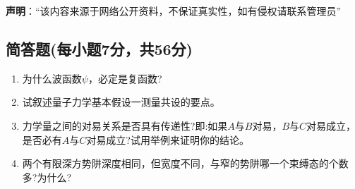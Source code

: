 
\textbf{声明}：“该内容来源于网络公开资料，不保证真实性，如有侵权请联系管理员”

\subsection{简答题(每小题7分，共56分)}
\begin{enumerate}
\item 为什么波函数$\psi$，必定是复函数?
\item 试叙述量子力学基本假设一测量共设的要点。
\item 力学量之间的对易关系是否具有传递性?即:如果$A$与$B$对易，$B$与$C$对易成立，是否必有$A$与$C$对易成立?试用举例来证明你的结论。
\item 两个有限深方势阱深度相同，但宽度不同，与窄的势阱哪一个束缚态的个数多?为什么?
\end{enumerate}
